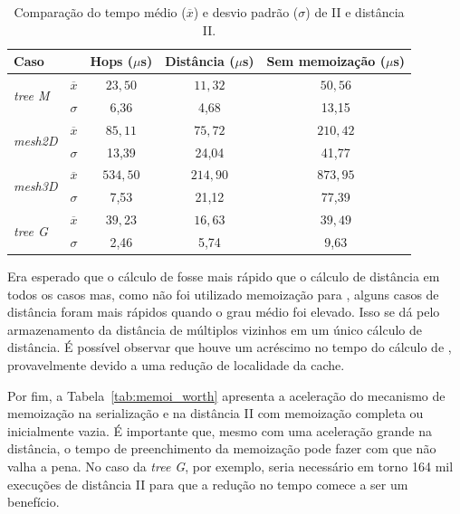 \setlength{\tabcolsep}{0.5em}
\begin{table}[!ht]
    \centering
    \begin{tabular}{l c c c c}
        \toprule
        \textbf{Caso}   &    & \textbf{Hops} ($\mu$s) &    \textbf{Distância} ($\mu$s) & \textbf{Sem memoização} ($\mu$s)\\ \midrule
        \multirow{2}{*}{\textit{tree M}} & $\overline{x}$    & $23,50$   & $11,32$  & $50,56$   \\ 
        & $\sigma$ & 6,36 & 4,68 & 13,15\\ \hline
        \multirow{2}{*}{\textit{mesh2D}} & $\overline{x}$    & $85,11$   & $75,72$ & $210,42$  \\
        & $\sigma$ & 13,39 & 24,04 & 41,77 \\ \hline
        \multirow{2}{*}{\textit{mesh3D}} & $\overline{x}$    & $534,50$  & $214,90$ & $873,95$  \\
        & $\sigma$ & 7,53 & 21,12 & 77,39 \\ \hline
        \multirow{2}{*}{\textit{tree G}} & $\overline{x}$     & $39,23$    & $16,63$ & $39,49$   \\
        & $\sigma$ & 2,46 & 5,74 & 9,63 \\ \bottomrule
    \end{tabular}
    \caption[Comparação entre hop e distância para vizinhança II.]{Comparação do tempo médio ($\overline{x}$) e desvio padrão ($\sigma$) de \hops II e distância II.}
    \label{tab:dist_hop}
\end{table}

Era esperado que o cálculo de \hops fosse mais rápido que o cálculo de distância em todos os casos mas, como não foi utilizado memoização para \hops, alguns casos de distância foram mais rápidos quando o grau médio foi elevado.
Isso se dá pelo armazenamento da distância de múltiplos vizinhos em um único cálculo de distância.
É possível observar que houve um acréscimo no tempo do cálculo de \hops, provavelmente devido a uma redução de localidade da cache.

Por fim, a Tabela~\ref{tab:memoi_worth} apresenta a aceleração do mecanismo de memoização na serialização e na distância II com memoização completa ou inicialmente vazia.
É importante que, mesmo com uma aceleração grande na distância, o tempo de preenchimento da memoização pode fazer com que não valha a pena.
No caso da \textit{tree G}, por exemplo, seria necessário em torno 164 mil execuções de distância II para que a redução no tempo comece a ser um benefício.

